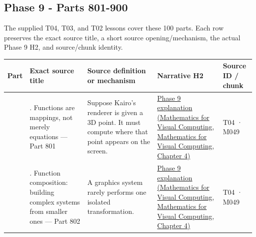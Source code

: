 \subsection{Phase 9 - Parts 801-900}\label{appendix-fd090d982a15-phase-9---parts-801-900}

The supplied T04, T03, and T02 lessons cover these 100 parts. Each row preserves the exact source title, a short source opening/mechanism, the actual Phase 9 H2, and source/chunk identity.

{\def\LTcaptype{none} %
\begin{longtable}[]{@{}
  >{\raggedleft\arraybackslash}p{}
  >{\raggedright\arraybackslash}p{}
  >{\raggedright\arraybackslash}p{}
  >{\raggedright\arraybackslash}p{}
  >{\raggedright\arraybackslash}p{}@{}}
\toprule\noalign{}
\begin{minipage}[b]{\linewidth}\raggedleft
Part
\end{minipage} & \begin{minipage}[b]{\linewidth}\raggedright
Exact source title
\end{minipage} & \begin{minipage}[b]{\linewidth}\raggedright
Source definition or mechanism
\end{minipage} & \begin{minipage}[b]{\linewidth}\raggedright
Narrative H2
\end{minipage} & \begin{minipage}[b]{\linewidth}\raggedright
Source ID / chunk
\end{minipage} \\
\midrule\noalign{}
\endhead
\bottomrule\noalign{}
\endlastfoot
801 & 1. Functions are mappings, not merely equations --- Part 801 & Suppose Kairo's renderer is given a 3D point. It must compute where that point appears on the screen. & \href{../02-Mathematics-for-Visual-Computing/main.pdf\#nameddest=01-foundations-i-ch020-functions-limits-continuity-and-scalar-change}{Phase 9 explanation (Mathematics for Visual Computing, Mathematics for Visual Computing, Chapter 4)} & T04 · M049 \\
802 & 2. Function composition: building complex systems from smaller ones --- Part 802 & A graphics system rarely performs one isolated transformation. & \href{../02-Mathematics-for-Visual-Computing/main.pdf\#nameddest=01-foundations-i-ch020-functions-limits-continuity-and-scalar-change}{Phase 9 explanation (Mathematics for Visual Computing, Mathematics for Visual Computing, Chapter 4)} & T04 · M049 \\

\end{longtable}}
